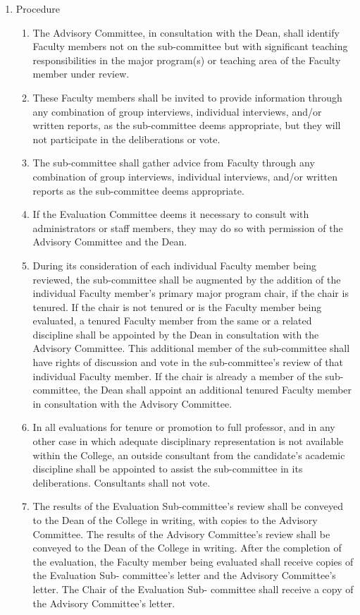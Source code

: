 \documentclass{manual}
\newcommand{\itemLevelA}{\alph*.}
\newcommand{\itemLevelB}{\arabic*)}
\newcommand{\itemRefA}{\alph*}
\newcommand{\itemRefB}{\arabic*}
\begin{document}
\begin{enumerate}[label=\itemLevelA,ref=\itemRefA]
\begin{enumerate}[label=\itemLevelB,ref=\itemRefB]
\end{enumerate}
\item Procedure \label{item:procedure08}
\begin{enumerate}[label=\itemLevelB,ref=\itemRefB]
\item The Advisory Committee, in consultation with the Dean, shall identify Faculty members not on the sub-committee but with significant teaching responsibilities in the major program(s) or teaching area of the Faculty member under review.
\item These Faculty members shall be invited to provide information through any combination of group interviews, individual interviews, and/or written reports, as the sub-committee deems appropriate, but they will not participate in the deliberations or vote.
\item The sub-committee shall gather advice from Faculty through any combination of group interviews, individual interviews, and/or written reports as the sub-committee deems appropriate.
\item If the Evaluation Committee deems it necessary to consult with administrators or staff members, they may do so with permission of the Advisory Committee and the Dean.
\item During its consideration of each individual Faculty member being reviewed, the sub-committee shall be augmented by the addition of the individual Faculty member's primary major program chair, if the chair is tenured. If the chair is not tenured or is the Faculty member being evaluated, a tenured Faculty member from the same or a related discipline shall be appointed by the Dean in consultation with the Advisory Committee. This additional member of the sub-committee shall have rights of discussion and vote in the sub-committee's review of that individual Faculty member. If the chair is already a member of the sub-committee, the Dean shall appoint an additional tenured Faculty member in consultation with the Advisory Committee.
\item In all evaluations for tenure or promotion to full professor, and in any other case in which adequate disciplinary representation is not available within the College, an outside consultant from the candidate's academic discipline shall be appointed to assist the sub-committee in its deliberations. Consultants shall not vote.
\item \label{item:results09} The results of the Evaluation Sub-committee's review shall be conveyed to the Dean of the College in writing, with copies to the Advisory Committee. The results of the Advisory Committee's review shall be conveyed to the Dean of the College in writing. After the completion of the evaluation, the Faculty member being evaluated shall receive copies of the Evaluation Sub- committee's letter and the Advisory Committee's letter. The Chair of the Evaluation Sub- committee shall receive a copy of the Advisory Committee's letter.

\end{enumerate}
\end{enumerate}
\end{document}
